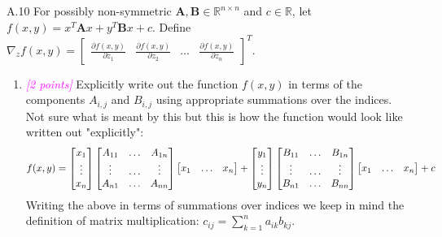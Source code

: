 \documentclass{article}
\newcommand{\field}[1]{\mathbb{#1}}
\newcommand{\1}{\mathbf{1}}
\newcommand{\R}{\field{R}} %
\newcommand{\mat}[1]{\boldsymbol{#1}} %
\newcommand{\points}[1]{\small\textcolor{magenta}{\emph{[#1 points]}} \normalsize}
\begin{document}
\newpage
A.10 For possibly non-symmetric $\mat{A}, \mat{B} \in \R^{n \times n}$ and $c \in \R$, let $f(x, y) = x^T \mat{A} x + y^T \mat{B} x + c$. Define $\nabla_z f(x,y) = \begin{bmatrix} \frac{\partial f(x,y)}{\partial z_1} & \frac{\partial f(x,y)}{\partial z_2} & \dots & \frac{\partial f(x,y)}{\partial z_n} \end{bmatrix}^T$.  
\begin{enumerate}
	\item \points{2} Explicitly write out the function $f(x, y)$ in terms of the components $A_{i,j}$ and $B_{i,j}$ using appropriate summations over the indices.\\
	Not sure what is meant by this but this is how the function would look like written out "explicitly":
	$$
	f(x, y) = 
	\begin{bmatrix} x_1  \\ \vdots \\ x_n \end{bmatrix} \begin{bmatrix} A_{11} & \hdots & A_{1n} \\ \vdots & \hdots & \vdots \\ A_{n1} & \hdots & A_{nn}\end{bmatrix} \begin{bmatrix} x_1  & \hdots & x_n \end{bmatrix} 
	+
	\begin{bmatrix} y_1  \\ \vdots \\ y_n \end{bmatrix} \begin{bmatrix} B_{11} & \hdots & B_{1n} \\ \vdots & \hdots & \vdots \\ B_{n1} & \hdots & B_{nn}\end{bmatrix} \begin{bmatrix} x_1  & \hdots & x_n \end{bmatrix} 
	+
	c \\
	$$
	Writing the above in terms of summations over indices we keep in mind the definition of matrix multiplication: $c_{ij} = \sum_{k=1}^n a_{ik}b_{kj}$. 
	

\end{enumerate}
\end{document}
